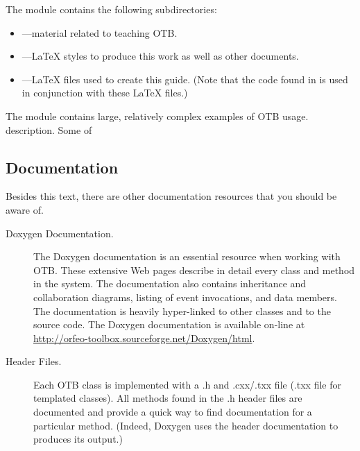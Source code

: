 The  module contains the following subdirectories:
\begin{itemize}
        \item {}---material related to
        teaching OTB.
        \item {}---\LaTeX{} styles to produce this
        work as well as other documents.
        \item {}---\LaTeX{} files used to
        create this guide. (Note that the code found in
         is used in conjunction with these \LaTeX{}
        files.)
\end{itemize}

The  module contains large, relatively complex
examples of OTB usage.%
description. Some of


\subsection{Documentation}
\label{sec:Documentation}

Besides this text, there are other documentation resources that you should be
aware of.
\begin{description}
        \item[Doxygen Documentation.] The Doxygen documentation is an
        essential resource when working with OTB. These extensive Web
        pages describe in detail every class and method in the
        system. The documentation also contains inheritance and
        collaboration diagrams, listing of event invocations, and data
        members. The documentation is heavily hyper-linked to other
        classes and to the source code. The Doxygen documentation is
        available on-line at
        \url{http://orfeo-toolbox.sourceforge.net/Doxygen/html}.

	\item[Header Files.] Each OTB class is implemented with a .h and
        .cxx/.txx file (.txx file for templated classes). All methods
        found in the .h header files are documented and provide a quick way
        to find documentation for a particular method. (Indeed, Doxygen uses
        the header documentation to produces its output.)
\end{description}


